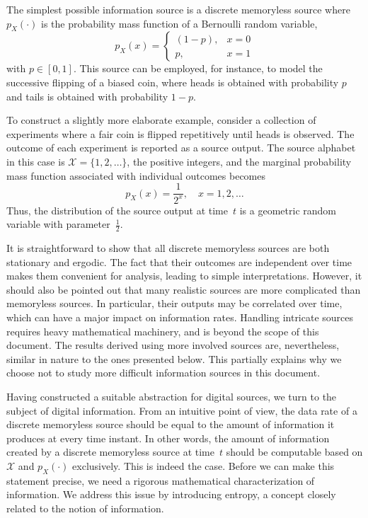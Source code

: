 \begin{example} \label{example:BinarySource}
The simplest possible information source is a discrete memoryless source where $p_X(\cdot)$ is the probability mass function of a Bernoulli random variable,
\begin{equation*}
p_X(x) = \begin{cases} (1 - p), & x = 0 \\
p, & x = 1 \end{cases}
\end{equation*}
with $p \in [0,1]$.
This source can be employed, for instance, to model the successive flipping of a biased coin, where heads is obtained with probability $p$ and tails is obtained with probability $1 - p$.
\end{example}

\begin{example}
To construct a slightly more elaborate example, consider a collection of experiments where a fair coin is flipped repetitively until heads is observed.
The outcome of each experiment is reported as a source output.
The source alphabet in this case is $\mathcal{X} = \{1, 2, \ldots \}$, the positive integers, and the marginal probability mass function associated with individual outcomes becomes
\begin{equation*}
p_X (x) = \frac{1}{2^x}, \quad x = 1, 2, \ldots
\end{equation*}
Thus, the distribution of the source output at time~$t$ is a geometric random variable with parameter~$\frac{1}{2}$.
\end{example}

It is straightforward to show that all discrete memoryless sources are both stationary and ergodic.
The fact that their outcomes are independent over time makes them convenient for analysis, leading to simple interpretations.
However, it should also be pointed out that many realistic sources are more complicated than memoryless sources.
In particular, their outputs may be correlated over time, which can have a major impact on information rates.
Handling intricate sources requires heavy mathematical machinery, and is beyond the scope of this document.
The results derived using more involved sources are, nevertheless, similar in nature to the ones presented below.
This partially explains why we choose not to study more difficult information sources in this document.

Having constructed a suitable abstraction for digital sources, we turn to the subject of digital information.
From an intuitive point of view, the data rate of a discrete memoryless source should be equal to the amount of information it produces at every time instant.
In other words, the amount of information created by a discrete memoryless source at time~$t$ should be computable based on $\mathcal{X}$ and $p_X(\cdot)$ exclusively.
This is indeed the case.
Before we can make this statement precise, we need a rigorous mathematical characterization of information.
We address this issue by introducing entropy, a concept closely related to the notion of information.


